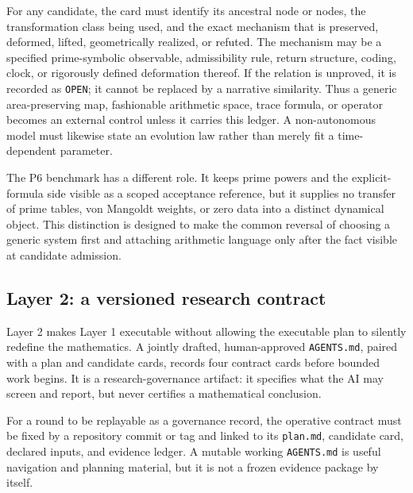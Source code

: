 For any candidate, the card must identify its ancestral node or nodes, the
transformation class being used, and the exact mechanism that is preserved,
deformed, lifted, geometrically realized, or refuted. The mechanism may be a
specified prime-symbolic observable, admissibility rule, return structure,
coding, clock, or rigorously defined deformation thereof. If the relation is
unproved, it is recorded as \texttt{OPEN}; it cannot be replaced by a narrative
similarity. Thus a generic area-preserving map, fashionable arithmetic space,
trace formula, or operator becomes an external control unless it carries this
ledger. A non-autonomous model must likewise state an evolution law rather than
merely fit a time-dependent parameter.

The P6 benchmark has a different role. It keeps prime powers and the
explicit-formula side visible as a scoped acceptance reference, but it supplies
no transfer of prime tables, von Mangoldt weights, or zero data into a distinct
dynamical object. This distinction is designed to make the common reversal of
choosing a generic system first and attaching arithmetic language only after
the fact visible at candidate admission.

\subsection{Layer 2: a versioned research contract}
\label{sec:contract}

Layer 2 makes Layer 1 executable without allowing the executable plan to
silently redefine the mathematics. A jointly drafted, human-approved
\texttt{AGENTS.md}, paired with a plan and candidate cards, records four
contract cards before bounded work begins. It is a research-governance
artifact: it specifies what the AI may screen and report, but never certifies a
mathematical conclusion.

For a round to be replayable as a governance record, the operative contract
must be fixed by a repository commit or tag and linked to its \texttt{plan.md},
candidate card, declared inputs, and evidence ledger. A mutable working
\texttt{AGENTS.md} is useful navigation and planning material, but it is not a
frozen evidence package by itself.

